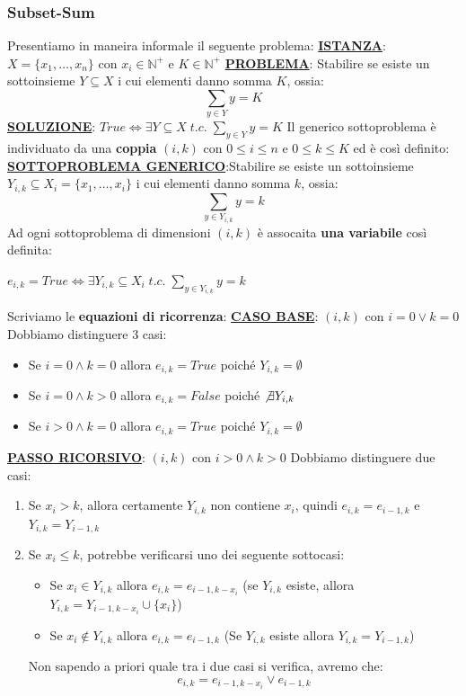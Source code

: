 \documentclass[12pt]{article}
\begin{document}
\subsubsection{Subset-Sum}
Presentiamo in maneira informale il seguente problema: \newline
\textbf{\underline{ISTANZA}}: $X = \{x_1, \dots, x_n\}$ con $x_i \in \mathbb{N}^+$ e $K \in \mathbb{N}^+$ \newline
\textbf{\underline{PROBLEMA}}: Stabilire se esiste un sottoinsieme $Y \subseteq X$ i cui elementi danno somma $K$, ossia:
$$\sum_{y \in Y} y = K$$
\textbf{\underline{SOLUZIONE}}: $True \Leftrightarrow \exists Y \subseteq X \; t.c. \; \sum_{y \in Y} y = K$ \newline
Il generico sottoproblema è individuato da una \textbf{coppia} $(i,k)$ con $0 \leq i \leq n$ e $0 \leq k \leq K$ ed è così definito: \newline
\textbf{\underline{SOTTOPROBLEMA GENERICO}}:Stabilire se esiste un sottoinsieme $Y_{i,k} \subseteq X_i = \{x_1, \dots, x_i\}$ i cui elementi danno somma $k$, ossia:
$$\sum_{y \in Y_{i,k}} y = k$$
Ad ogni sottoproblema di dimensioni $(i,k)$ è assocaita \textbf{una variabile} così definita:
\begin{center}
    $e_{i,k} = True \Leftrightarrow \exists Y_{i,k} \subseteq X_i \; t.c. \; \sum_{y \in Y_{i,k}} y = k$
\end{center} 
Scriviamo le \textbf{equazioni di ricorrenza}: \newline
\textbf{\underline{CASO BASE}}: $(i, k)$ con $i = 0 \vee k = 0$ \newline
Dobbiamo distinguere 3 casi:
\begin{itemize}
    \item Se $i = 0 \land k = 0$ allora $e_{i,k} = True$ poiché $Y_{i,k} = \emptyset$
    \item Se $i = 0 \land k > 0$ allora $e_{i,k} = False$ poiché $\not\exists Y_{i,k}$
    \item Se $i > 0 \land k = 0$ allora $e_{i,k} = True$ poiché $Y_{i,k} = \emptyset$
\end{itemize}
\textbf{\underline{PASSO RICORSIVO}}: $(i,k)$ con $i > 0 \land k > 0$ \newline
Dobbiamo distinguere due casi:
\begin{enumerate}
    \item Se $x_i > k$, allora certamente $Y_{i,k}$ non contiene $x_i$, quindi $e_{i,k} = e_{i-1, k}$ e $Y_{i,k} = Y_{i-1,k}$
    \item Se $x_i \leq k$, potrebbe verificarsi uno dei seguente sottocasi:
    \begin{itemize}
        \item Se $x_i \in Y_{i,k}$ allora $e_{i,k} = e_{i-1, k - x_i}$ (se $Y_{i,k}$ esiste, allora $Y_{i,k} = Y_{i-1, k-x_i} \cup \{x_i\}$)
        \item Se $x_i \notin Y_{i,k}$ allora $e_{i,k} = e_{i-1, k}$ (Se $Y_{i,k}$ esiste allora $Y_{i,k} = Y_{i-1, k}$)
    \end{itemize}
    Non sapendo a priori quale tra i due casi si verifica, avremo che:
    $$e_{i,k} = e_{i-1, k-x_i} \vee e_{i-1, k}$$
\end{enumerate}
\end{document}
